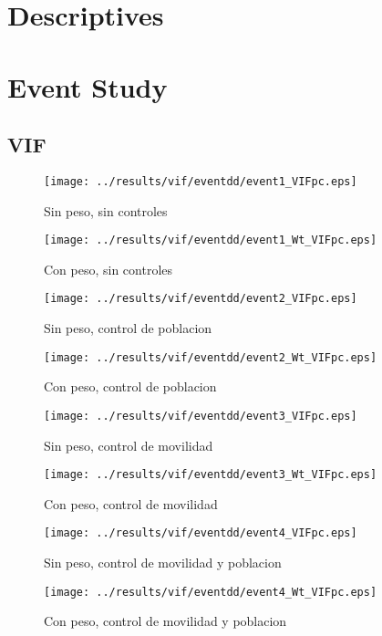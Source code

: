 \documentclass[11pt,letterpaper]{article}
\begin{document}
\section{Descriptives}

\section{Event Study}
	\subsection{VIF}
\begin{figure}[H]
\caption{Sin peso, sin controles}
\centering
\texttt{[image: ../results/vif/eventdd/event1\_VIFpc.eps]}
\end{figure}

\begin{figure}[H]
\caption{Con peso, sin controles}
\centering
\texttt{[image: ../results/vif/eventdd/event1\_Wt\_VIFpc.eps]}
\end{figure}
\begin{figure}[H]
\caption{Sin peso, control de poblacion}
\centering
\texttt{[image: ../results/vif/eventdd/event2\_VIFpc.eps]}
\end{figure}

\begin{figure}[H]
\caption{Con peso, control de poblacion}
\centering
\texttt{[image: ../results/vif/eventdd/event2\_Wt\_VIFpc.eps]}
\end{figure}
\begin{figure}[H]
\caption{Sin peso, control de movilidad}
\centering
\texttt{[image: ../results/vif/eventdd/event3\_VIFpc.eps]}
\end{figure}

\begin{figure}[H]
\caption{Con peso, control de movilidad}
\centering
\texttt{[image: ../results/vif/eventdd/event3\_Wt\_VIFpc.eps]}
\end{figure}
\begin{figure}[H]
\caption{Sin peso, control de movilidad y poblacion}
\centering
\texttt{[image: ../results/vif/eventdd/event4\_VIFpc.eps]}
\end{figure}

\begin{figure}[H]
\caption{Con peso, control de movilidad y poblacion}
\centering
\texttt{[image: ../results/vif/eventdd/event4\_Wt\_VIFpc.eps]}
\end{figure}
\end{document}
